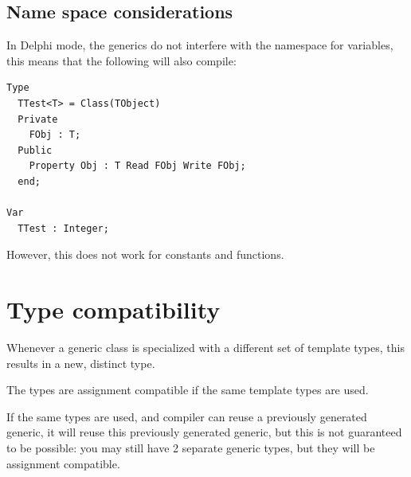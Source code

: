 \subsection{Name space considerations}
In Delphi mode, the generics do not interfere with the namespace for variables, this means that the following will also compile:
\begin{verbatim}
Type
  TTest<T> = Class(TObject)
  Private
    FObj : T;
  Public
    Property Obj : T Read FObj Write FObj;
  end;

Var
  TTest : Integer;
\end{verbatim}
However, this does not work for constants and functions.

\section{Type compatibility}
Whenever a generic class is specialized with a different set of template
types, this results in a new, distinct type.

The types are assignment compatible if the same template types are used. 

If the same types are used, and compiler can reuse a previously generated
generic, it will reuse this previously generated generic, but this is
not guaranteed to be possible: you may still have 2 separate generic types,
but they will be assignment compatible.

